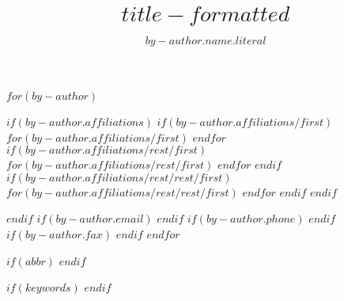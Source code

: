 $for(by-author)$
\author{$by-author.name.literal$}
$if(by-author.affiliations)$
$if(by-author.affiliations/first)$
$for(by-author.affiliations/first)$
$endfor$
$if(by-author.affiliations/rest/first)$
$for(by-author.affiliations/rest/first)$
$endfor$
$endif$
$if(by-author.affiliations/rest/rest/first)$
$for(by-author.affiliations/rest/rest/first)$
$endfor$
$endif$
$endif$

$endif$
$if(by-author.email)$
$endif$
$if(by-author.phone)$
$endif$
$if(by-author.fax)$
$endif$
$endfor$

$if(abbr)$
$endif$

$if(keywords)$
$endif$

\title[$title-short$]{$title-formatted$}
\makeatletter